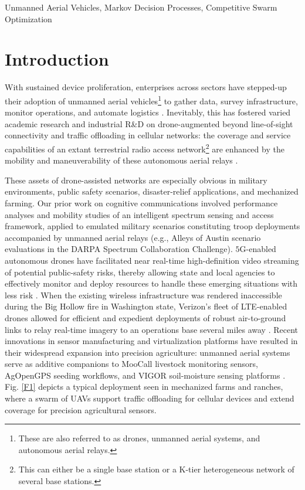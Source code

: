 \documentclass[12pt, draftcls, onecolumn]{IEEEtran}
\theoremstyle{plain}
\theoremstyle{definition}
\theoremstyle{remark}
\begin{document}
\begin{IEEEkeywords}
Unmanned Aerial Vehicles, Markov Decision Processes, Competitive Swarm Optimization
\end{IEEEkeywords}
\vspace{-4mm}


\section{Introduction}\label{S1}
\vspace{-2mm}

With sustained device proliferation, enterprises across sectors have stepped-up their adoption of unmanned aerial vehicles\footnote{These are also referred to as drones, unmanned aerial systems, and autonomous aerial relays.} to gather data, survey infrastructure, monitor operations, and automate logistics \cite{UAVSurvey, UAVTutorial}. Inevitably, this has fostered varied academic research and industrial R\&D on drone-augmented beyond line-of-sight connectivity and traffic offloading in cellular networks: the coverage and service capabilities of an extant terrestrial radio access network\footnote{This can either be a single base station or a K-tier heterogeneous network of several base stations.} are enhanced by the mobility and maneuverability of these autonomous aerial relays \cite{LOSDominance, FundamentalTradeoffs}. 

These assets of drone-assisted networks are especially obvious in military environments, public safety scenarios, disaster-relief applications, and mechanized farming. Our prior work on cognitive communications \cite{TCCN} involved performance analyses and mobility studies of an intelligent spectrum sensing and access framework, applied to emulated military scenarios constituting troop deployments accompanied by unmanned aerial relays (e.g., Alleys of Austin scenario evaluations in the DARPA Spectrum Collaboration Challenge). $5$G-enabled autonomous drones have facilitated near real-time high-definition video streaming of potential public-safety risks, thereby allowing state and local agencies to effectively monitor and deploy resources to handle these emerging situations with less risk \cite{VerizonPublicSafety}. When the existing wireless infrastructure was rendered inaccessible during the Big Hollow fire in Washington state, Verizon's fleet of LTE-enabled drones allowed for efficient and expedient deployments of robust air-to-ground links to relay real-time imagery to an operations base several miles away \cite{VerizonDisasterRelief}. Recent innovations in sensor manufacturing and virtualization platforms have resulted in their widespread expansion into precision agriculture: unmanned aerial systems serve as additive companions to MooCall livestock monitoring sensors, AgOpenGPS seeding workflows, and VIGOR soil-moisture sensing platforms \cite{VerizonAgriculture}. Fig. \ref{F1} depicts a typical deployment seen in mechanized farms and ranches, where a swarm of UAVs support traffic offloading for cellular devices and extend coverage for precision agricultural sensors.
\end{document}
